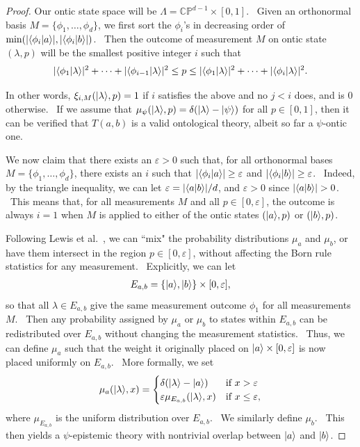 \documentclass[letterpaper,11pt]{article}
\newcommand{\ba}{\begin{eqnarray}}
\newcommand{\ea}{\end{eqnarray}}
\newcommand{\braket}[2]{\mbox{$ \langle #1 | #2 \rangle $}}
\newcommand{\ket}[1]{\mbox{$ | #1 \rangle $}}
\begin{document}
\begin{proof}
Our ontic state space will be $\Lambda=\mathbb{CP}^{d-1}\times [0,1]$. \ Given an orthonormal basis $M=\{\phi_1,\ldots,\phi_d\}$, we first sort the $\phi_i$'s in decreasing order of $\min(|\braket{\phi_i}{a}|,|\braket{\phi_i}{b}|)$. \ Then the outcome of measurement $M$ on ontic state $(\lambda,p)$ will be the smallest positive integer $i$ such that
\ba |\braket{\phi_1}{\lambda}|^2+\cdots+|\braket{\phi_{i-1}}{\lambda}|^2\leq p \leq |\braket{\phi_1}{\lambda}|^2+\cdots+|\braket{\phi_i}{\lambda}|^2. \ea

\noindent In other words, $\xi_{i,M}(\ket{\lambda},p)=1$ if $i$ satisfies the above and no $j<i$ does, and is $0$ otherwise. \ If we assume that $\mu_{\psi}(\ket{\lambda},p)=\delta(\ket{\lambda}-\ket{\psi})$ for all $p\in[0,1]$, then it can be verified that $T(a,b)$ is a valid ontological theory, albeit so far a $\psi$-ontic one.

We now claim that there exists an $\varepsilon>0$ such that, for all orthonormal bases $M=\{\phi_1,\ldots,\phi_d\}$, there exists an $i$ such that $|\braket{\phi_i}{a}|\geq\varepsilon$ and $|\braket{\phi_i}{b}|\geq\varepsilon$. \ Indeed, by the triangle inequality, we can let $\varepsilon=|\braket{a}{b}|/d$, and $\varepsilon >0$ since $|\braket{a}{b}|>0$. \ This means that, for all measurements $M$ and all $p\in[0,\varepsilon]$, the outcome is always $i=1$ when $M$ is applied to either of the ontic states $(\ket{a},p)$ or $(\ket{b},p)$.

Following Lewis et al.\ \cite{lewis}, we can ``mix" the probability distributions $\mu_a$ and $\mu_b$, or have them intersect in the region $p\in [0,\varepsilon]$, without affecting the Born rule statistics for any measurement. \ Explicitly, we can let
\ba E_{a,b} = \{\ket{a},\ket{b}\} \times [0,\varepsilon], \ea
so that all $\lambda\in E_{a,b}$ give the same measurement outcome $\phi_1$ for all measurements $M$. \ Then any probability assigned by $\mu_{a}$ or $\mu_{b}$ to states within $E_{a,b}$ can be redistributed over $E_{a,b}$ without changing the measurement statistics. \ Thus, we can define $\mu_{a}$ such that the weight it originally placed on $\ket{a} \times [0,\varepsilon]$ is now placed uniformly on $E_{a,b}$. \ More formally, we set
\ba \mu_{a}(\ket{\lambda},x) =
  \begin{cases}
   \delta(\ket{\lambda}-\ket{a})  & \text{if } x > \varepsilon \\
   \varepsilon\mu_{E_{a,b}}(\ket{\lambda},x)       & \text{if } x\leq \varepsilon,
  \end{cases} \ea
where $\mu_{E_{a,b}}$ is the uniform distribution over $E_{a,b}$. \ We similarly define $\mu_{b}$. \ This then yields a $\psi$-epistemic theory with nontrivial overlap between $\ket{a}$ and $\ket{b}$.


\end{proof}
\end{document}
